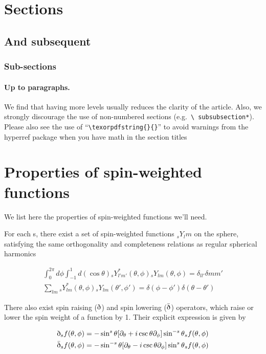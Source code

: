 \documentclass[a4paper,11pt]{article}
\newcommand{\sr}{\text{\normalfont\dh}}
\renewcommand{\sl}{\bar{\text{\normalfont\dh}}}
\begin{document}
\section{Sections}
\subsection{And subsequent}
\subsubsection{Sub-sections}
\paragraph{Up to paragraphs.} We find that having more levels usually
reduces the clarity of the article. Also, we strongly discourage the
use of non-numbered sections (e.g.~\texttt{\textbackslash
  subsubsection*}).  Please also see the use of
``\texttt{\textbackslash texorpdfstring\{\}\{\}}'' to avoid warnings
from the hyperref package when you have math in the section titles



\appendix

\section{Properties of spin-weighted functions}
We list here the properties of spin-weighted functions we'll need. 

For each s, there exist a set of spin-weighted functions $_sY_lm$ on the sphere, satisfying the same orthogonality and completeness relations as regular spherical harmonics

\begin{align}
\int_0^{2\pi} d\phi \int_{-1}^{1} d(\cos{\theta}) {}_sY_{l'm'}^*(\theta,\phi){}_sY_{lm}(\theta,\phi) = \delta_{ll'}\delta{mm'} \\
\sum_{lm} {}_sY_{lm}^*(\theta,\phi){}_sY_{lm}(\theta',\phi')=\delta(\phi-\phi')\delta(\theta-\theta')
\end{align}

There also exist spin raising ($\sr$) and spin lowering ($\sl$) operators, which raise or lower the spin weight of a function by 1. Their explicit expression is given by

\begin{align}
\sr {}_sf(\theta, \phi) &= -\sin^s{\theta}[\partial_\theta+i\csc{\theta}\partial_\phi]\sin^{-s}{\theta}{}_sf(\theta, \phi)\\
\sl {}_sf(\theta, \phi) &= -\sin^{-s}{\theta}[\partial_\theta-i\csc{\theta}\partial_\phi]\sin^{s}{\theta}{}_sf(\theta, \phi)
\end{align}
\end{document}
